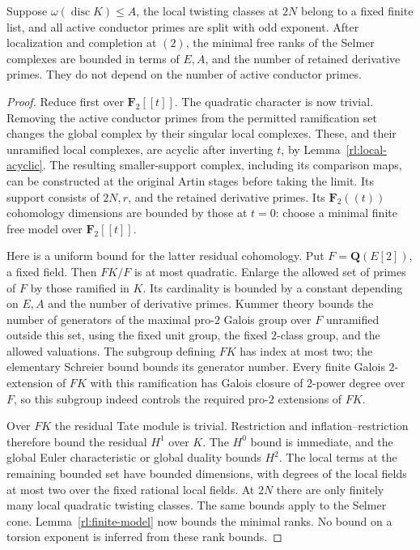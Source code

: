 \begin{lemma}\label{rl:residual-bound}
Suppose $\omega(\operatorname{disc}K)\leq A$, the local twisting classes
at $2N$ belong to a fixed finite list, and all active conductor primes
are split with odd exponent.  After localization and completion at
$(2)$, the minimal free ranks of the Selmer complexes are bounded in
terms of $E,A$, and the number of retained derivative primes.  They do
not depend on the number of active conductor primes.
\end{lemma}

\begin{proof}
Reduce first over $\mathbf F_2[[t]]$.  The quadratic character is now
trivial.  Removing the active conductor primes from the permitted
ramification set changes the global complex by their singular local
complexes.  These, and their unramified local complexes, are acyclic
after inverting $t$, by Lemma~\ref{rl:local-acyclic}.  The resulting
smaller-support complex, including its comparison maps, can be
constructed at the original Artin stages before taking the limit.
Its support consists of $2N,r$, and the retained derivative primes.
Its $\mathbf F_2((t))$ cohomology dimensions are bounded by those at
$t=0$: choose a minimal finite free model over $\mathbf F_2[[t]]$.

Here is a uniform bound for the latter residual cohomology.  Put
$F=\mathbf Q(E[2])$, a fixed field.  Then $FK/F$ is at most quadratic.
Enlarge the allowed set of primes of $F$ by those ramified in $K$.
Its cardinality is bounded by a constant depending on $E,A$ and the
number of derivative primes.  Kummer theory bounds the number of
generators of the maximal pro-$2$ Galois group over $F$ unramified
outside this set, using the fixed unit group, the fixed $2$-class group,
and the allowed valuations.  The subgroup defining $FK$ has index at
most two; the elementary Schreier bound bounds its generator number.
Every finite Galois $2$-extension of $FK$ with this ramification has
Galois closure of $2$-power degree over $F$, so this subgroup indeed
controls the required pro-$2$ extensions of $FK$.

Over $FK$ the residual Tate module is trivial.  Restriction and
inflation--restriction therefore bound the residual $H^1$ over $K$.
The $H^0$ bound is immediate, and the global Euler characteristic or
global duality bounds $H^2$.  The local terms at the remaining bounded
set have bounded dimensions, with degrees of the local fields at most
two over the fixed rational local fields.  At $2N$ there are only
finitely many local quadratic twisting classes.  The same bounds
apply to the Selmer cone.  Lemma~\ref{rl:finite-model} now bounds the
minimal ranks.  No bound on a torsion exponent is inferred from these
rank bounds.
\end{proof}

